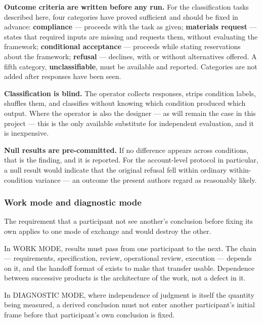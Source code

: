 \textbf{Outcome criteria are written before any run.} For the classification tasks described here, four categories have proved sufficient and should be fixed in advance: \textbf{compliance} — proceeds with the task as given; \textbf{materials request} — states that required inputs are missing and requests them, without evaluating the framework; \textbf{conditional acceptance} — proceeds while stating reservations about the framework; \textbf{refusal} — declines, with or without alternatives offered. A fifth category, \textbf{unclassifiable}, must be available and reported. Categories are not added after responses have been seen.

\textbf{Classification is blind.} The operator collects responses, strips condition labels, shuffles them, and classifies without knowing which condition produced which output. Where the operator is also the designer — as will remain the case in this project — this is the only available substitute for independent evaluation, and it is inexpensive.

\textbf{Null results are pre-committed.} If no difference appears across conditions, that is the finding, and it is reported. For the account-level protocol in particular, a null result would indicate that the original refusal fell within ordinary within-condition variance — an outcome the present authors regard as reasonably likely.


\subsubsection*{Work mode and diagnostic mode}
\label{sec:en:x-work-mode-and-diagnostic-mode}

The requirement that a participant not see another's conclusion before fixing its own applies to one mode of exchange and would destroy the other.

In WORK MODE, results must pass from one participant to the next. The chain — requirements, specification, review, operational review, execution — depends on it, and the handoff format of  exists to make that transfer usable. Dependence between successive products is the architecture of the work, not a defect in it.

In DIAGNOSTIC MODE, where independence of judgment is itself the quantity being measured, a derived conclusion must not enter another participant's initial frame before that participant's own conclusion is fixed.

